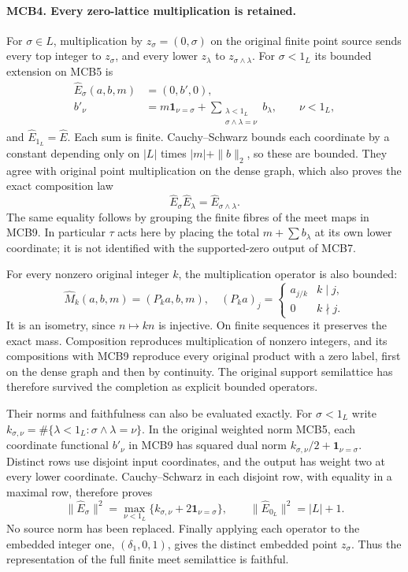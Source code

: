 \paragraph{MCB4. Every zero-lattice multiplication is retained.}
For \(\sigma\in L\), multiplication by \(z_\sigma=(0,\sigma)\)
on the original finite point source sends every top integer to
\(z_\sigma\), and every lower \(z_\lambda\) to
\(z_{\sigma\wedge\lambda}\). For \(\sigma<1_L\) its bounded
extension on MCB5 is
\[
 \begin{split}
 \widehat E_\sigma(a,b,m)&=(0,b',0),\\
 b'_\nu&=m\mathbf1_{\nu=\sigma}
     +\sum_{\substack{\lambda<1_L\\\sigma\wedge\lambda=\nu}}
           b_\lambda,\qquad \nu<1_L,
 \end{split}\tag{MCB9}
\]
and \(\widehat E_{1_L}=\widehat E\). Each sum is finite.
Cauchy--Schwarz bounds each coordinate by a constant depending
only on \(|L|\) times \(|m|+\|b\|_2\), so these are bounded.
They agree with original point multiplication on the dense graph,
which also proves the exact composition law
\[
 \widehat E_\sigma\widehat E_\lambda
                 =\widehat E_{\sigma\wedge\lambda}.           \tag{MCB10}
\]
The same equality follows by grouping the finite fibres of the
meet maps in MCB9. In particular \(\tau\) acts here by placing
the total \(m+\sum b_\lambda\) at its own lower coordinate;
it is not identified with the supported-zero output of MCB7.

For every nonzero original integer \(k\), the multiplication
operator is also bounded:
\[
 \widehat M_k(a,b,m)=(P_ka,b,m),\quad
 (P_ka)_j=\begin{cases}a_{j/k}&k\mid j,\\0&k\nmid j.\end{cases}
                                                               \tag{MCB11}
\]
It is an isometry, since \(n\mapsto kn\) is injective.
On finite sequences it preserves the exact mass. Composition
reproduces multiplication of nonzero integers, and its compositions
with MCB9 reproduce every original product with a zero label,
first on the dense graph and then by continuity. The original
support semilattice has therefore survived the completion as
explicit bounded operators.

Their norms and faithfulness can also be evaluated exactly. For
\(\sigma<1_L\) write
\(k_{\sigma,\nu}=\#\{\lambda<1_L:\sigma\wedge\lambda=\nu\}\).
In the original weighted norm MCB5, each coordinate functional
\(b'_\nu\) in MCB9 has squared dual norm
\(k_{\sigma,\nu}/2+\mathbf1_{\nu=\sigma}\).
Distinct rows use disjoint input coordinates, and the output
has weight two at every lower coordinate. Cauchy--Schwarz in
each disjoint row, with equality in a maximal row, therefore proves
\[
 \|\widehat E_\sigma\|^2
  =\max_{\nu<1_L}\{k_{\sigma,\nu}+2\mathbf1_{\nu=\sigma}\},
 \qquad \|\widehat E_{0_L}\|^2=|L|+1.                \tag{MCB21}
\]
No source norm has been replaced. Finally applying each operator
to the embedded integer one, \((\delta_1,0,1)\), gives the
distinct embedded point \(z_\sigma\). Thus the representation
of the full finite meet semilattice is faithful.

